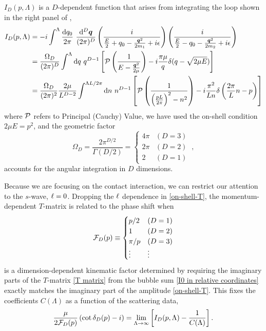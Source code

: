 $I_D(p,\Lambda)$ is a $D$-dependent function that arises from integrating the loop shown in the right panel of ,
\begin{align}
    I_D(p, \Lambda)
    &=-i\int^{\Lambda}
        \frac { \mathrm {d}q_0}{2\pi}\ \frac{\mathrm { d } ^ { D } \vec{ q } } { (2\pi)^ { D } }
        \left( \frac { i } { \frac{E}{2} + q _ { 0 } - \frac{\vec{q}^2}{2m_1} + i \epsilon } \right)
        \left( \frac { i } { \frac{E}{2} - q _ { 0 } - \frac{\vec{q}^2}{2m_2} + i \epsilon } \right)
    \label{eq:I0 in two particle language}\\
    &=\frac{\Omega_D}{(2\pi)^D}\int^{\Lambda}  \mathrm { d } q \ q^{D-1}\left[\PV \left( \frac { 1 } { E - \frac{\vec{q}^2}{2\mu} } \right)
-i\frac{\pi \mu}{q}\delta(q-\sqrt{2 \mu E})\right]
    \label{eq:I0 in relative coordinates}
    \\
    &=\frac{\Omega_D}{(2\pi)^2}\frac{2\mu}{L^{D-2}}\int^{\Lambda L/2\pi}  \mathrm { d } n \ n^{D-1}\left[\PV \left( \frac { 1 } { \left(\frac{pL}{2\pi}\right)^2 - n^2 } \right)
-i\frac{\pi^2}{L n}\delta\left(\frac{2\pi}{L}n -p\right)\right]
    \label{eq:I0}
\end{align}
where $\mathcal{P}$ refers to Principal (Cauchy) Value, we have used the on-shell condition $2\mu E=p^2$, and the geometric factor
\begin{equation}
\Omega_D=\frac{2\pi^{D/2}}{\Gamma(D/2)}=
    \begin{cases}
        4\pi    &   (D=3)\\
        2\pi    &   (D=2)\\
        2       &   (D=1)
    \end{cases}\ ,
\end{equation}
accounts for the angular integration in $D$ dimensions.

Because we are focusing on the contact interaction, we can restrict our attention to the $s$-wave, $\ell=0$.
Dropping the $\ell$ dependence in \eqref{on-shell-T}, the momentum-dependent $T$-matrix is related to the phase shift when
\begin{equation}\label{eq:spherical FD}
    \mathcal{F}_{D}(p)
    \equiv
    \begin{cases}
        p/2     & (D=1)\\
        1       & (D=2)\\
        \pi/p   & (D=3)\\
        \vdots  & \vdots
\end{cases}
\end{equation}
is a dimension-dependent kinematic factor determined by requiring the imaginary parts of the $T$-matrix \eqref{T matrix} from the bubble sum \eqref{I0 in relative coordinates} exactly matches the imaginary part of the amplitude \eqref{on-shell-T}.
This fixes the coefficients $C(\Lambda)$ as a function of the scattering data,
\begin{equation}\label{eq:IV pole}
    \frac{\mu}{2 \mathcal{F}_{D}(p)}\left(\cot \delta_{D}(p) - i\right)
    =
    \lim\limits_{\Lambda \to \infty} \left[ I_D(p, \Lambda) - \frac{1}{C(\Lambda)} \right].
\end{equation}

